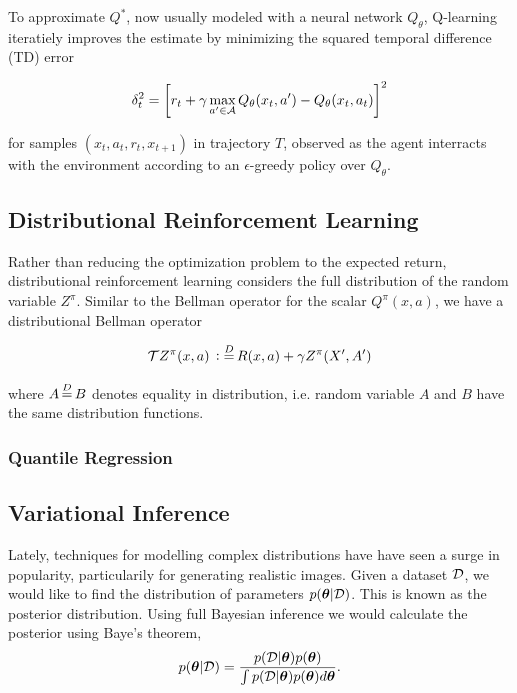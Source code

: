 \documentclass[twoside]{article}
\begin{document}
To approximate \(Q^*\), now usually modeled with a neural network \(Q_\theta\),
Q-learning~\citep{watkins89} iteratiely improves the estimate by minimizing the
squared temporal difference (TD) error

\begin{equation}
  \delta^2_t = \left[ r_t + \gamma \max_{a^\prime \in \mathcal{A}}
  Q_\theta(x_t, a^\prime) - Q_\theta(x_t, a_t) \right]^2
\end{equation}

for samples \((x_t, a_t, r_t, x_{t+1})\) in trajectory \(T\), observed as the
agent interracts with the environment according to an \(\epsilon\)-greedy policy
over \(Q_\theta\).

\subsection{Distributional Reinforcement Learning}

Rather than reducing the optimization problem to the expected return,
distributional reinforcement learning considers the full distribution of the 
random variable \(Z^\pi\). Similar to the Bellman operator for the scalar
\(Q^\pi(x,a)\), we have a distributional Bellman operator

\begin{equation}
  \T Z^\pi(x, a) \distdefeq R(x, a) + \gamma Z^\pi(X^\prime, A^\prime)
\end{equation}

\noindent
where \(A \eqdist B\) denotes equality in distribution, i.e. random variable
\(A\) and \(B\) have the same distribution functions.

\subsubsection{Quantile Regression}

\subsection{Variational Inference}


Lately, techniques for modelling complex distributions have have seen a surge
in popularity, particularily for generating realistic images. Given a dataset
\(\mathcal{D}\), we would like to find the distribution of parameters
\(p(\boldsymbol \theta \vert \mathcal{D})\). This is known as the posterior distribution. Using
full Bayesian inference we would calculate the posterior using Baye's theorem,
\begin{equation}
  p(\boldsymbol \theta \vert \mathcal{D}) = \frac{p(\mathcal{D} \vert \boldsymbol \theta)p(\boldsymbol \theta)}{
    \int p(\mathcal{D} \vert \boldsymbol \theta) p(\boldsymbol \theta) d\boldsymbol \theta}.
\end{equation}
\end{document}
